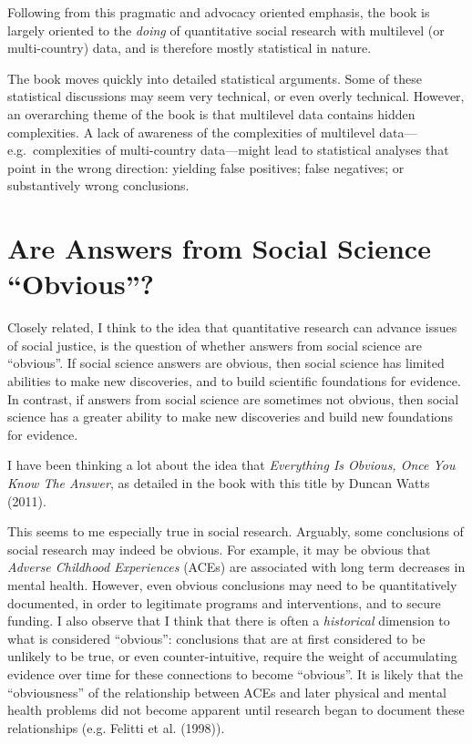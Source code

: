 \documentclass[
  letterpaper,
  DIV=11,
  numbers=noendperiod]{scrreprt}
\begin{document}
Following from this pragmatic and advocacy oriented emphasis, the book
is largely oriented to the \emph{doing} of quantitative social research
with multilevel (or multi-country) data, and is therefore mostly
statistical in nature.

The book moves quickly into detailed statistical arguments. Some of
these statistical discussions may seem very technical, or even overly
technical. However, an overarching theme of the book is that multilevel
data contains hidden complexities. A lack of awareness of the
complexities of multilevel data---e.g.~complexities of multi-country
data---might lead to statistical analyses that point in the wrong
direction: yielding false positives; false negatives; or substantively
wrong conclusions.

\section{Are Answers from Social Science
``Obvious''?}\label{sec-obvious}

Closely related, I think to the idea that quantitative research can
advance issues of social justice, is the question of whether answers
from social science are ``obvious''. If social science answers are
obvious, then social science has limited abilities to make new
discoveries, and to build scientific foundations for evidence. In
contrast, if answers from social science are sometimes not obvious, then
social science has a greater ability to make new discoveries and build
new foundations for evidence.

I have been thinking a lot about the idea that \emph{Everything Is
Obvious, Once You Know The Answer}, as detailed in the book with this
title by Duncan Watts (2011). 

This seems to me especially true in social research. Arguably, some
conclusions of social research may indeed be obvious. For example, it
may be obvious that \emph{Adverse Childhood Experiences} (ACEs) are
associated with long term decreases in mental health. However, even
obvious conclusions may need to be quantitatively documented, in order
to legitimate programs and interventions, and to secure funding. I also
observe that I think that there is often a \emph{historical} dimension
to what is considered ``obvious'': conclusions that are at first
considered to be unlikely to be true, or even counter-intuitive, require
the weight of accumulating evidence over time for these connections to
become ``obvious''. It is likely that the ``obviousness'' of the
relationship between ACEs and later physical and mental health problems
did not become apparent until research began to document these
relationships (e.g. Felitti et al. (1998)).
\end{document}
